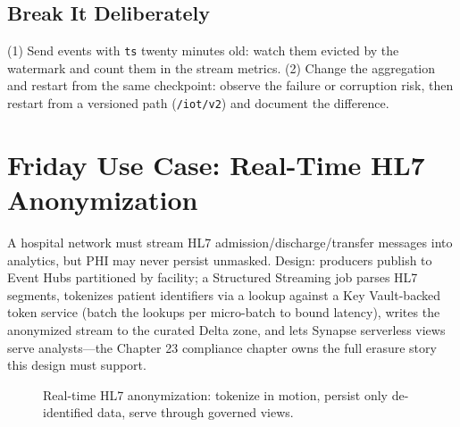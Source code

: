\subsection{Break It Deliberately}
(1) Send events with \texttt{ts} twenty minutes old: watch them evicted by the watermark and count them in the stream metrics. (2) Change the aggregation and restart from the same checkpoint: observe the failure or corruption risk, then restart from a versioned path (\texttt{/iot/v2}) and document the difference.

\section{Friday Use Case: Real-Time HL7 Anonymization}
A hospital network must stream HL7 admission/discharge/transfer messages into analytics, but PHI may never persist unmasked. Design: producers publish to Event Hubs partitioned by facility; a Structured Streaming job parses HL7 segments, tokenizes patient identifiers via a lookup against a Key Vault-backed token service (batch the lookups per micro-batch to bound latency), writes the anonymized stream to the curated Delta zone, and lets Synapse serverless views serve analysts---the Chapter 23 compliance chapter owns the full erasure story this design must support.

\begin{figure}[H]
    \centering
    \caption{Real-time HL7 anonymization: tokenize in motion, persist only de-identified data, serve through governed views.}
    \label{fig:ch15-hl7}
\end{figure}

